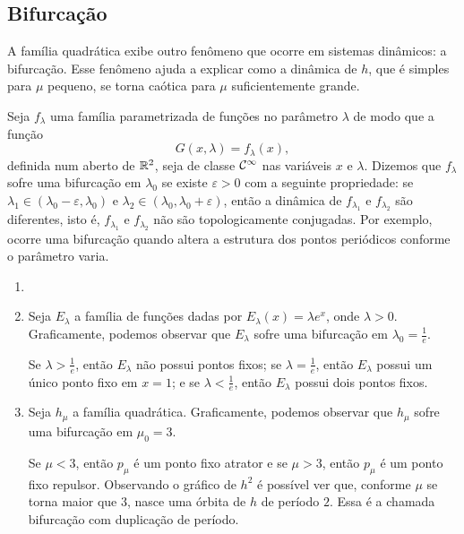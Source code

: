 \subsection{Bifurcação}

A família quadrática exibe outro fenômeno que ocorre em sistemas dinâmicos: a bifurcação. Esse fenômeno ajuda a explicar como a dinâmica de $h$, que é simples para $\mu$ pequeno, se torna caótica para $\mu$ suficientemente grande.

Seja $f_\lambda$ uma família parametrizada de funções no parâmetro $\lambda$ de modo que a função
$$G(x, \lambda) = f_\lambda(x),$$
definida num aberto de $\mathbb{R}^2$, seja de classe $\mathcal{C}^\infty$ nas variáveis $x$ e $\lambda$.
Dizemos que $f_\lambda$ sofre uma bifurcação em $\lambda_0$ se existe $\varepsilon > 0$ com a seguinte propriedade: se $\lambda_1 \in (\lambda_0 - \varepsilon, \lambda_0)$ e $\lambda_2 \in (\lambda_0, \lambda_0 + \varepsilon)$, então a dinâmica de $f_{\lambda_1}$ e $f_{\lambda_2}$ são diferentes, isto é, $f_{\lambda_1}$ e $f_{\lambda_2}$ não são topologicamente conjugadas.
Por exemplo, ocorre uma bifurcação quando altera a estrutura dos pontos periódicos conforme o parâmetro varia.

\begin{example}
\begin{enumerate}[label=\alph*)]\item[]
\item 
Seja $E_\lambda$ a família de funções dadas por $E_\lambda(x) = \lambda e^x$, onde $\lambda > 0$. Graficamente, podemos observar que $E_\lambda$ sofre uma bifurcação em $\lambda_0 = \frac{1}{e}$.

Se $\lambda > \frac{1}{e}$, então $E_\lambda$ não possui pontos fixos; se $\lambda = \frac{1}{e}$, então $E_\lambda$ possui um único ponto fixo em $x = 1$; e se $\lambda < \frac{1}{e}$, então $E_\lambda$ possui dois pontos fixos.

\item Seja $h_\mu$ a família quadrática. Graficamente, podemos observar que $h_\mu$ sofre uma bifurcação em $\mu_0 = 3$.

Se $\mu < 3$, então $p_\mu$ é um ponto fixo atrator e se $\mu >3$, então $p_\mu$ é um ponto fixo repulsor. Observando o gráfico de $h^2$ é possível ver que, conforme $\mu$ se torna maior que $3$, nasce uma órbita de $h$ de período $2$. Essa é a chamada bifurcação com duplicação de período.

\end{enumerate}
\end{example}

